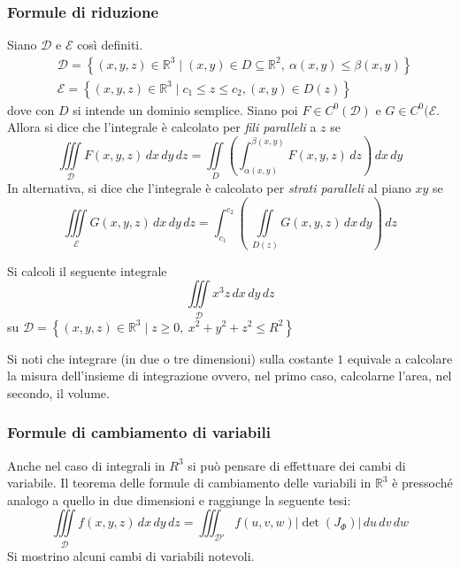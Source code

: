 \subsubsection{Formule di riduzione}
Siano $\mathcal{D}$ e $\mathcal{E}$ così definiti.
\begin{align}
    &\mathcal{D}=\left\{(x,y,z) \in \mathbb{R}^3 \mid (x,y) \in D \subseteq \mathbb{R}^2,\ \alpha(x, y) \leq \beta(x,y) \right\}\\
    &\mathcal{E}= \left\{(x,y,z) \in \mathbb{R}^3 \mid c_1\leq z \leq c_2, (x,y) \in D(z)\right\}
\end{align}
dove con $D$ si intende un dominio semplice. Siano poi $F \in C^0(\mathcal{D})$ e $G \in C^0(\mathcal{E}$.
Allora si dice che l'integrale è calcolato per \textit{fili paralleli} a $z$ se
\begin{equation}
    \iiint\limits_{\mathcal{D}} F(x,y,z)\, dx\, dy\,dz= \iint\limits_{D}{\left(\int_{\alpha(x,y)}^{\beta(x,y)}{F(x,y,z)\, dz}\right)}\,dx\, dy
\end{equation}
In alternativa, si dice che l'integrale è calcolato per \textit{strati paralleli} al piano $xy$ se
\begin{equation}
\iiint\limits_{\mathcal{E}}{G(x,y,z)\, dx\,dy\,dz} = \int_{c_1}^{c_2}{\left(\ \iint\limits_{D(z)}{G(x,y,z) \, dx\,dy} \right)\, dz}
\end{equation}
\begin{example}[TO-DO]
    Si calcoli il seguente integrale
    \begin{equation*}
    \iiint\limits_{\mathcal{D}}{x^3z}\,dx\,dy\,dz
    \end{equation*}
    su $\mathcal{D}= \left\{(x,y,z) \in \mathbb{R}^3 \mid z \geq 0,\ x^2+y^2+z^2\leq R^2\right\}$
\end{example}
\begin{oss}    
Si noti che integrare (in due o tre dimensioni) sulla costante $1$ equivale a calcolare la misura dell'insieme di integrazione ovvero, nel primo caso, calcolarne l'area, nel secondo, il volume.
\end{oss}
\subsubsection{Formule di cambiamento di variabili}
Anche nel caso di integrali in $R^3$ si può pensare di effettuare dei cambi di variabile. Il teorema delle formule di cambiamento delle variabili in $\mathbb{R}^3$ è pressoché analogo a quello in due dimensioni e raggiunge la seguente tesi:
\begin{equation}
    \iiint\limits_{\mathcal{D}}{f(x,y,z)}\,dx\,dy\,dz=\iiint_{\mathcal{D}'}{f(u,v,w)|\det(J_\Phi)|}\,du\,dv\,dw
\end{equation}
Si mostrino alcuni cambi di variabili notevoli.

